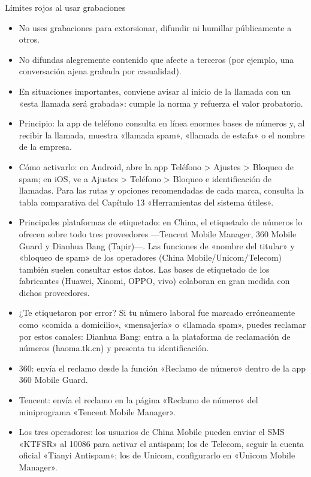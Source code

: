 \begin{tcbwarn}{Límites rojos al usar grabaciones}
\begin{itemize}
  \item No uses grabaciones para extorsionar, difundir ni humillar públicamente a otros.
  \item No difundas alegremente contenido que afecte a terceros (por ejemplo, una conversación ajena grabada por casualidad).
  \item En situaciones importantes, conviene avisar al inicio de la llamada con un «esta llamada será grabada»: cumple la norma y refuerza el valor probatorio.
\end{itemize}

\end{tcbwarn}


\begin{itemize}
  \item Principio: la app de teléfono consulta en línea enormes bases de números y, al recibir la llamada, muestra «llamada spam», «llamada de estafa» o el nombre de la empresa.
  \item Cómo activarlo: en Android, abre la app Teléfono > Ajustes > Bloqueo de spam; en iOS, ve a Ajustes > Teléfono > Bloqueo e identificación de llamadas. Para las rutas y opciones recomendadas de cada marca, consulta la tabla comparativa del Capítulo 13 «Herramientas del sistema útiles».
  \item Principales plataformas de etiquetado: en China, el etiquetado de números lo ofrecen sobre todo tres proveedores —Tencent Mobile Manager, 360 Mobile Guard y Dianhua Bang (Tapir)—. Las funciones de «nombre del titular» y «bloqueo de spam» de los operadores (China Mobile/Unicom/Telecom) también suelen consultar estos datos. Las bases de etiquetado de los fabricantes (Huawei, Xiaomi, OPPO, vivo) colaboran en gran medida con dichos proveedores.
  \item ¿Te etiquetaron por error? Si tu número laboral fue marcado erróneamente como «comida a domicilio», «mensajería» o «llamada spam», puedes reclamar por estos canales: Dianhua Bang: entra a la plataforma de reclamación de números (haoma.tk.cn) y presenta tu identificación.
  \item 360: envía el reclamo desde la función «Reclamo de número» dentro de la app 360 Mobile Guard.
  \item Tencent: envía el reclamo en la página «Reclamo de número» del miniprograma «Tencent Mobile Manager».
  \item Los tres operadores: los usuarios de China Mobile pueden enviar el SMS «KTFSR» al 10086 para activar el antispam; los de Telecom, seguir la cuenta oficial «Tianyi Antispam»; los de Unicom, configurarlo en «Unicom Mobile Manager».
\end{itemize}


